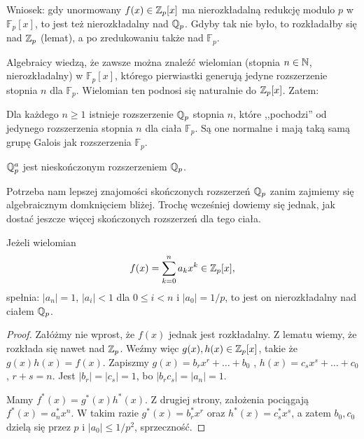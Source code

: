 Wniosek: gdy unormowany $f(x) \in \mathbb Z_p[x]$ ma nierozkładalną redukcję modulo $p$ w $\mathbb F_p[x]$, to jest też nierozkładalny nad $\mathbb Q_p$.
Gdyby tak nie było, to rozkładałby się nad $\mathbb Z_p$ (lemat), a po zredukowaniu także nad $\mathbb F_p$.

Algebraicy wiedzą, że zawsze można znaleźć wielomian (stopnia $n \in \mathbb N$, nierozkładalny) w $\mathbb F_p[x]$, którego pierwiastki generują jedyne rozszerzenie stopnia $n$ dla $\mathbb F_p$.
Wielomian ten podnosi się naturalnie do $\mathbb Z_p[x]$. Zatem:

\begin{fakt}
	Dla każdego $n \ge 1$ istnieje rozszerzenie $\mathbb Q_p$ stopnia $n$, które ,,pochodzi'' od jedynego rozszerzenia stopnia $n$ dla ciała $\mathbb F_p$.
	Są one normalne i mają taką samą grupę Galois jak rozszerzenia $\mathbb F_p$.
\end{fakt}

\begin{wniosek}
	$\mathbb Q_p^a$ jest nieskończonym rozszerzeniem $\mathbb Q_p$.
\end{wniosek}

Potrzeba nam lepszej znajomości skończonych rozszerzeń $\mathbb Q_p$ zanim zajmiemy się algebraicznym domknięciem bliżej.  
Trochę wcześniej dowiemy się jednak, jak dostać jeszcze więcej skończonych rozszerzeń dla tego ciała.

\begin{twierdzenie}\label{einstein}
	Jeżeli wielomian
	\[
		f(x) = \sum_{k=0}^n a_kx^k \in \mathbb Z_p[x],
	\]
	spełnia: $|a_n| = 1$, $|a_i| < 1$ dla $0 \le i < n$ i $|a_0| = 1/p$, to jest on nierozkładalny nad ciałem $\mathbb Q_p$.
\end{twierdzenie}

\begin{proof}
	Załóżmy nie wprost, że $f(x)$ jednak jest rozkładalny.
	Z lematu wiemy, że rozkłada się nawet nad $\mathbb Z_p$.
	Weźmy więc $g(x), h(x) \in \mathbb Z_p[x]$, takie że $g(x) h(x) = f(x)$.
	Zapiszmy $g(x) = b_rx^r + \dots + b_0$ , $h(x) = c_s x^s + \dots + c_0$, $r+s = n$.
	Jest $|b_r| = |c_s| = 1$, bo $|b_rc_s| = |a_n| = 1$.

	Mamy $f^*(x) = g^*(x)h^*(x)$.
	Z drugiej strony, założenia pociągają $f^*(x) = a_n^* x^n$.
	W takim razie $g^*(x) = b^*_r x^r$ oraz $h^*(x) = c_s^* x^s$, a zatem $b_0, c_0$ dzielą się przez $p$ i $|a_0| \le 1/p^2$, sprzeczność.
\end{proof}